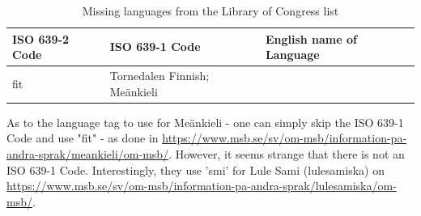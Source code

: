 \begin{table}[!ht]
    \caption{Missing languages from the Library of Congress list}
    \label{tab:languagesMissing}
    \begin{tabular}{L{3cm}|L{3cm}|L{6.5cm}}
      \textbf{ISO 639-2 Code} & \textbf{ISO 639-1 Code} & \textbf{English name of Language}\\
      \hline
fit & Tornedalen Finnish; \foreignlanguage{finnish}{Meänkieli}\\
\hline
   \end{tabular}
\end{table}
\FloatBarrier

As to the language tag to use for Meänkieli - one can simply skip the ISO 639-1 Code and use "fit" - as done in \url{https://www.msb.se/sv/om-msb/information-pa-andra-sprak/meankieli/om-msb/}.
However, it seems strange that there is not an ISO 639-1 Code. Interestingly, they use 'smi' for Lule Sami (\foreignlanguage{swedish}{lulesamiska}) on \url{https://www.msb.se/sv/om-msb/information-pa-andra-sprak/lulesamiska/om-msb/}.

